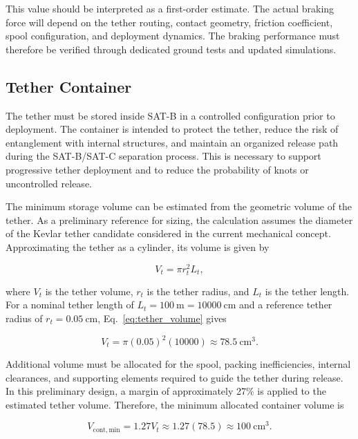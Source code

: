 This value should be interpreted as a first-order estimate. The actual braking force will depend on the tether routing, contact geometry, friction coefficient, spool configuration, and deployment dynamics. The braking performance must therefore be verified through dedicated ground tests and updated simulations.

\subsection{Tether Container}
\label{sub:tether_container}

The tether must be stored inside SAT-B in a controlled configuration prior to deployment. The container is intended to protect the tether, reduce the risk of entanglement with internal structures, and maintain an organized release path during the SAT-B/SAT-C separation process. This is necessary to support progressive tether deployment and to reduce the probability of knots or uncontrolled release.

The minimum storage volume can be estimated from the geometric volume of the tether. As a preliminary reference for sizing, the calculation assumes the diameter of the Kevlar tether candidate considered in the current mechanical concept. Approximating the tether as a cylinder, its volume is given by

\begin{equation}
V_t = \pi r_t^2 L_t ,
\label{eq:tether_volume}
\end{equation}

where \(V_t\) is the tether volume, \(r_t\) is the tether radius, and \(L_t\) is the tether length. For a nominal tether length of \(L_t = 100~\mathrm{m} = 10000~\mathrm{cm}\) and a reference tether radius of \(r_t = 0.05~\mathrm{cm}\), Eq.~\eqref{eq:tether_volume} gives

\begin{equation}
V_t =
\pi (0.05)^2(10000)
\approx 78.5~\mathrm{cm^3}.
\label{eq:tether_volume_value}
\end{equation}

Additional volume must be allocated for the spool, packing inefficiencies, internal clearances, and supporting elements required to guide the tether during release. In this preliminary design, a margin of approximately 27\% is applied to the estimated tether volume. Therefore, the minimum allocated container volume is

\begin{equation}
V_{\mathrm{cont,min}}
=
1.27 V_t
\approx
1.27(78.5)
\approx
100~\mathrm{cm^3}.
\label{eq:minimum_container_volume}
\end{equation}

